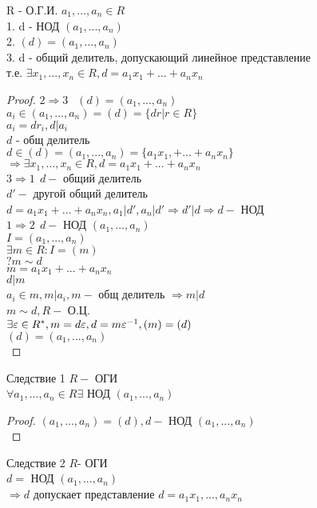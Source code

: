 \begin{theorem}
	R - О.Г.И. $ a_1, ..., a_n \in  R $ \\
	1. d - НОД $ (a_1, ..., a_n) $ \\
	2. $ (d) =  (a_1, ..., a_n) $ \\
	3. d - общий делитель, допускающий линейное представление \\
	т.е. $ \exists x_1, ..., x_n \in R, d = a_1x_1 + ... + a_nx_n $ \\
	\begin{proof}
		$ 2 \Rightarrow 3 \ \ $ $ (d) =  (a_1, ..., a_n)  $\\
		$ a_i \in  (a_1, ..., a_n)  = (d) = \{dr | r \in R \} $ \\
		$ a_i = dr_i, d|a_i $ \\
		$ d $ - общ делитель \\
		$ d \in (d) =  (a_1, ..., a_n) = \{ a_1x_1, + ... + a_nx_n \} $\\
		$ \Rightarrow \exists x_1, ..., x_n \in R, d = a_1x_1 + ... + a_nx_n $ \\
		$ 3 \Rightarrow 1 \ \ d - $ общий делитель \\
		$ d' - $ другой общий делитель \\
		$   d = a_1x_1 + ... + a_nx_n, a_1 | d', a_n | d' \Rightarrow d' | d \Rightarrow d - $ НОД \\
		$ 1 \Rightarrow 2  \ \  d - $ НОД $  (a_1, ..., a_n) $ \\
		$ I =  (a_1, ..., a_n) $ \\
		$ \exists m \in R : I = (m) $ \\
		$ ? m \sim d $ \\
		$ m = a_1x_1 + ... + a_nx_n $ \\
		$ d | m $ \\
		$ a_i \in m, m | a_i, m - $ общ делитель $ \Rightarrow m | d $ \\
		$ m \sim d, R - $ О.Ц.  \\
		$ \exists \varepsilon \in R^*, m = d\varepsilon, d = m\varepsilon^{-1}, (m) = (d) $ \\
		$ (d) =  (a_1, ..., a_n) $ \\
	\end{proof}
\end{theorem}

Следствие 1 $ R - $ ОГИ \\
$ \forall a_1, ..., a_n \in R \exists $ НОД $  (a_1, ..., a_n) $\\
\begin{proof}
	$  (a_1, ..., a_n)  = (d), d -$ НОД $  (a_1, ..., a_n) $ \\
\end{proof}
Следствие 2 $ R $- ОГИ \\
$ d =$ НОД $  (a_1, ..., a_n) $\\
$ \Rightarrow d $ допускает представление $ d = a_1x_1, ..., a_nx_n $ \\

